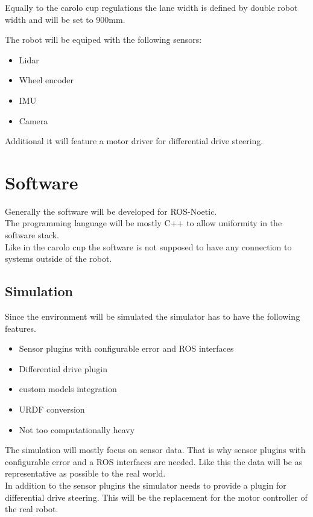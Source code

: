 Equally to the carolo cup regulations the lane width is defined by double robot width and will be set to 900mm. 

The robot will be equiped with the following sensors:

\begin{itemize}
	\item Lidar
	\item Wheel encoder
	\item IMU
	\item Camera
\end{itemize}

Additional it will feature a motor driver for differential drive steering.

\section{Software}
Generally the software will be developed for ROS-Noetic.\\
The programming language will be mostly C++ to allow uniformity in the software stack.\\
Like in the carolo cup the software is not supposed to have any connection to systems outside of the robot.\\

\subsection{Simulation}
Since the environment will be simulated the simulator has to have the following features.
\begin{itemize}
	\item Sensor plugins with configurable error and ROS interfaces
	\item Differential drive plugin
	\item custom models integration
	\item URDF conversion
	\item Not too computationally heavy
\end{itemize}

The simulation will mostly focus on sensor data. That is why sensor plugins with configurable error and a ROS interfaces are needed. Like this the data will be as representative as possible to the real world.\\

In addition to the sensor plugins the simulator needs to provide a plugin for differential drive steering. This will be the replacement for the motor controller of the real robot.\\

